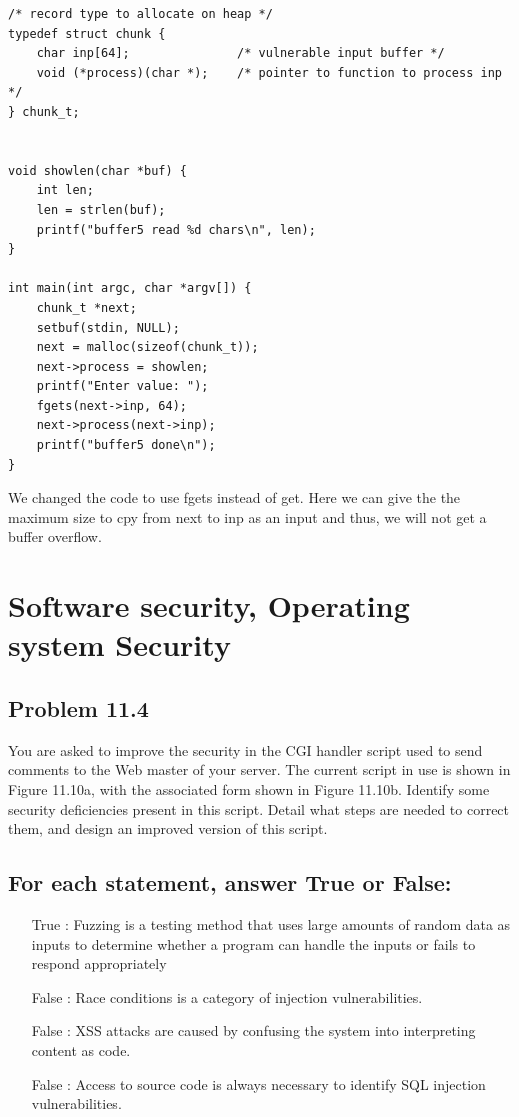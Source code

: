 \documentclass{article}
\begin{document}
\begin{lstlisting}[style=CStyle]
/* record type to allocate on heap */ 
typedef struct chunk {   
    char inp[64];               /* vulnerable input buffer */    
    void (*process)(char *);    /* pointer to function to process inp */ 
} chunk_t;


void showlen(char *buf) { 
    int len;    
    len = strlen(buf);    
    printf("buffer5 read %d chars\n", len); 
}

int main(int argc, char *argv[]) {    
    chunk_t *next;  
    setbuf(stdin, NULL);   
    next = malloc(sizeof(chunk_t));   
    next->process = showlen;    
    printf("Enter value: ");    
    fgets(next->inp, 64);  
    next->process(next->inp);    
    printf("buffer5 done\n");     
}
\end{lstlisting}
We changed the code to use fgets instead of get. Here we can give the the maximum size to cpy from next to inp as an input and thus, we will not get a buffer overflow.

\section{Software security, Operating system Security}
\subsection{Problem 11.4}
You are asked to improve the security in the CGI handler script used to send comments to
the Web master of your server. The current script in use is shown in 
Figure 11.10a, with the associated form shown in Figure 11.10b. Identify some security
deficiencies present in this script. Detail what steps are needed to correct them,
and design an improved version of this script.
\subsection{For each statement, answer True or False:}
\begin{itemize}
    \item[True]: Fuzzing is a testing method that uses large amounts of random data
    as inputs to determine whether a program can handle the inputs or fails to respond
    appropriately
    \item[False]: Race conditions is a category of injection vulnerabilities.
    \item[False]: XSS attacks are caused by confusing the system into interpreting content as code.
    \item[False]: Access to source code is always necessary to identify SQL injection
    vulnerabilities.
\end{itemize}
\end{document}
